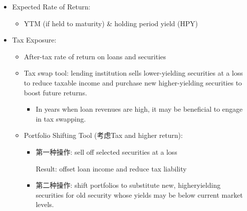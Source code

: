 \begin{itemize}
\item Expected Rate of Return:
    \begin{itemize}
    \item YTM (if held to maturity) \& holding period yield (HPY)
    \end{itemize}
\item Tax Exposure:
    \begin{itemize}
    \item After-tax rate of return on loans and securities
    \item Tax swap tool: lending institution sells lower-yielding securities at a loss to reduce taxable income and purchase new higher-yielding securities to boost future returns.
        \begin{itemize}
        \item In years when loan revenues are high, it may be beneficial to engage in tax swapping.
        \end{itemize}
        
    \item Portfolio Shifting Tool (考虑Tax and higher return):
        \begin{itemize}
        \item 第一种操作: sell off selected securities at a loss
        
        Result: offset loan income and reduce tax liability
        \item 第二种操作: shift portfolios to substitute new, higheryielding securities for old security whose yields may be below current market levels.
        

\end{itemize}
\end{itemize}
\end{itemize}
